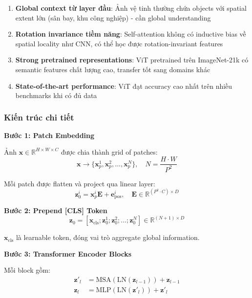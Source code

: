 \documentclass[12pt,a4paper]{article}
\begin{document}
\begin{enumerate}
    \item \textbf{Global context từ layer đầu}: Ảnh vệ tinh thường chứa objects với spatial extent lớn (sân bay, khu công nghiệp) - cần global understanding
    
    \item \textbf{Rotation invariance tiềm năng}: Self-attention không có inductive bias về spatial locality như CNN, có thể học được rotation-invariant features
    
    \item \textbf{Strong pretrained representations}: ViT pretrained trên ImageNet-21k có semantic features chất lượng cao, transfer tốt sang domains khác \cite{he2022masked}
    
    \item \textbf{State-of-the-art performance}: ViT đạt accuracy cao nhất trên nhiều benchmarks khi có đủ data
\end{enumerate}

\subsubsection{Kiến trúc chi tiết}

\textbf{Bước 1: Patch Embedding}

Ảnh $\mathbf{x} \in \mathbb{R}^{H \times W \times C}$ được chia thành grid of patches:
\begin{equation}
    \mathbf{x} \rightarrow \{\mathbf{x}_p^1, \mathbf{x}_p^2, ..., \mathbf{x}_p^N\}, \quad N = \frac{H \cdot W}{P^2}
\end{equation}

Mỗi patch được flatten và project qua linear layer:
\begin{equation}
    \mathbf{z}_0^i = \mathbf{x}_p^i \mathbf{E} + \mathbf{e}_{\text{pos}}^i, \quad \mathbf{E} \in \mathbb{R}^{(P^2 \cdot C) \times D}
\end{equation}

\textbf{Bước 2: Prepend [CLS] Token}
\begin{equation}
    \mathbf{z}_0 = [\mathbf{x}_{\text{cls}}; \mathbf{z}_0^1; \mathbf{z}_0^2; ...; \mathbf{z}_0^N] \in \mathbb{R}^{(N+1) \times D}
\end{equation}

$\mathbf{x}_{\text{cls}}$ là learnable token, đóng vai trò aggregate global information.

\textbf{Bước 3: Transformer Encoder Blocks}

Mỗi block gồm:
\begin{align}
    \mathbf{z}'_l &= \text{MSA}(\text{LN}(\mathbf{z}_{l-1})) + \mathbf{z}_{l-1} \label{eq:msa} \\
    \mathbf{z}_l &= \text{MLP}(\text{LN}(\mathbf{z}'_l)) + \mathbf{z}'_l \label{eq:mlp}
\end{align}
\end{document}
